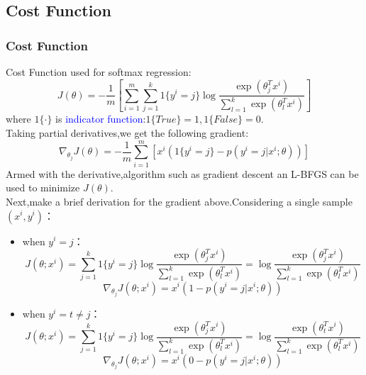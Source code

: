 \documentclass{beamer}
\begin{document}
\begin{CJK*}{UTF8}{gbsn}
\subsection{Cost Function}
\begin{frame}[allowframebreaks]\frametitle{Cost Function}
Cost Function used for softmax regression:
\begin{equation}
J(\theta)=-\frac{1}{m}\left[\sum_{i=1}^m\sum_{j=1}^k1\{y^i=j\}\log\frac{\exp(\theta_j^Tx^i)}{\sum_{l=1}^k\exp(\theta_l^Tx^i)}\right]
\end{equation}
where $1\{\cdot\}$ is \textcolor{blue}{indicator function}:$1\{True\}=1,1\{False\}=0$.\\
\vspace{0.5cm}
Taking partial derivatives,we get the following gradient:
\begin{equation}\label{eq:pthetaj}
\nabla_{\theta_j}J(\theta)=-\frac{1}{m}\sum_{i=1}^m\left[x^i(1\{y^i=j\}-p(y^i=j|x^i;\theta))\right]
\end{equation}
Armed with the derivative,algorithm such as gradient descent an L-BFGS can be used to minimize $J(\theta)$.\\

\newpage
Next,make a brief derivation for the gradient above.Considering a single sample $(x^i,y^i)$：
\begin{itemize}
\item when $y^i=j$：
\begin{equation}
J(\theta;x^i)=\sum_{j=1}^k1\{y^i=j\}\log\frac{\exp(\theta_j^Tx^i)}{\sum_{l=1}^k\exp(\theta_l^Tx^i)}=\log\frac{\exp(\theta_j^Tx^i)}{\sum_{l=1}^k\exp(\theta_l^Tx^i)}
\end{equation}
\begin{equation}
\nabla_{\theta_j}J(\theta;x^i)=x^i(1-p(y^i=j|x^i;\theta))
\end{equation}
\item when $y^i=t\neq j$：
\begin{equation}
J(\theta;x^i)=\sum_{j=1}^k1\{y^i=j\}\log\frac{\exp(\theta_j^Tx^i)}{\sum_{l=1}^k\exp(\theta_l^Tx^i)}=\log\frac{\exp(\theta_t^Tx^i)}{\sum_{l=1}^k\exp(\theta_l^Tx^i)}
\end{equation}
\begin{equation}
\nabla_{\theta_j}J(\theta;x^i)=x^i(0-p(y^i=j|x^i;\theta))
\end{equation}
\end{itemize}
\end{frame}


\end{CJK*}
\end{document}
